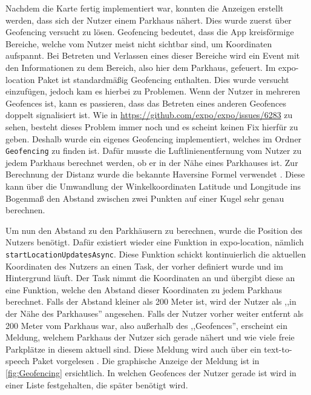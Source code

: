 Nachdem die Karte fertig implementiert war, konnten die Anzeigen erstellt werden, dass sich der Nutzer einem Parkhaus nähert. Dies wurde zuerst über Geofencing versucht zu lösen. Geofencing bedeutet, dass die App kreisförmige Bereiche, welche vom Nutzer meist nicht sichtbar sind, um Koordinaten aufspannt. Bei Betreten und Verlassen eines dieser Bereiche wird ein Event mit den Informationen zu dem Bereich, also hier dem Parkhaus, gefeuert. Im expo-location Paket ist standardmäßig Geofencing enthalten. Dies wurde versucht einzufügen, jedoch kam es hierbei zu Problemen. Wenn der Nutzer in mehreren Geofences ist, kann es passieren, dass das Betreten eines anderen Geofences doppelt signalisiert ist. Wie in \url{https://github.com/expo/expo/issues/6283} zu sehen, besteht dieses Problem immer noch und es scheint keinen Fix hierfür zu geben. Deshalb wurde ein eigenes Geofencing implementiert, welches im Ordner \verb|Geofencing| zu finden ist. Dafür musste die Luftlinienentfernung vom Nutzer zu jedem Parkhaus berechnet werden, ob er in der Nähe eines Parkhauses ist. Zur Berechnung der Distanz wurde die bekannte Haversine Formel verwendet \cite{haversine}. Diese kann über die Umwandlung der Winkelkoordinaten Latitude und Longitude ins Bogenmaß den Abstand zwischen zwei Punkten auf einer Kugel sehr genau berechnen.

Um nun den Abstand zu den Parkhäusern zu berechnen, wurde die Position des Nutzers benötigt. Dafür existiert wieder eine Funktion in expo-location, nämlich \verb|startLocationUpdatesAsync|. Diese Funktion schickt kontinuierlich die aktuellen Koordinaten des Nutzers an einen Task, der vorher definiert wurde und im Hintergrund läuft. Der Task nimmt die Koordinaten an und übergibt diese an eine Funktion, welche den Abstand dieser Koordinaten zu jedem Parkhaus berechnet. Falls der Abstand kleiner als 200 Meter ist, wird der Nutzer als ,,in der Nähe des Parkhauses'' angesehen. Falls der Nutzer vorher weiter entfernt als 200 Meter vom Parkhaus war, also außerhalb des ,,Geofences'', erscheint ein Meldung, welchem Parkhaus der Nutzer sich gerade nähert und wie viele freie Parkplätze in diesem aktuell sind. Diese Meldung wird auch über ein text-to-speech Paket vorgelesen \cite{tts}. Die graphische Anzeige der Meldung ist in \autoref{fig:Geofencing} ersichtlich. In welchen Geofences der Nutzer gerade ist wird in einer Liste festgehalten, die später benötigt wird.

